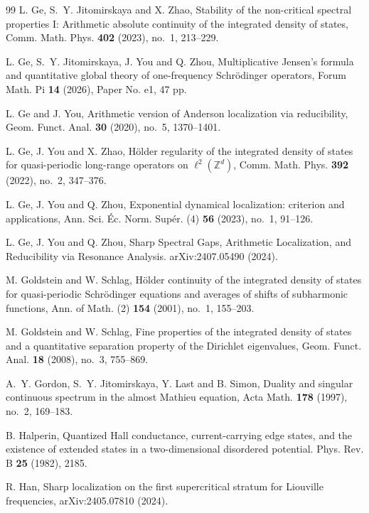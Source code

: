 \documentclass[reqno,11pt]{amsart}
\newcommand{\Z}{{\mathbb Z}}
\begin{document}
\begin{thebibliography}{99}
L. Ge, S.~Y. Jitomirskaya and X. Zhao, Stability of the non-critical spectral properties I: Arithmetic absolute continuity of the integrated density of states, Comm. Math. Phys. {\bf 402} (2023), no.~1, 213--229.

L. Ge, S.~Y. Jitomirskaya, J. You and Q. Zhou, Multiplicative Jensen's formula and quantitative global theory of one-frequency Schr\"odinger operators, Forum Math. Pi {\bf 14} (2026), Paper No. e1, 47 pp.



L. Ge and J. You, Arithmetic version of Anderson localization via reducibility, Geom. Funct. Anal. {\bf 30} (2020), no.~5, 1370--1401.

L. Ge, J. You and X. Zhao, H\"older regularity of the integrated density of states for quasi-periodic long-range operators on $\ell^2(\Z^d)$, Comm. Math. Phys. {\bf 392} (2022), no.~2, 347--376.

     L. Ge, J. You and Q. Zhou, Exponential dynamical localization: criterion and applications, Ann. Sci. \'Ec. Norm. Sup\'er. (4) {\bf 56} (2023), no.~1, 91--126.

     L. Ge, J. You and Q. Zhou, Sharp Spectral Gaps, Arithmetic Localization, and Reducibility via Resonance Analysis. arXiv:2407.05490 (2024).
	 



M. Goldstein and W. Schlag, H\"older continuity of the integrated density of states for quasi-periodic Schr\"odinger equations and averages of shifts of subharmonic functions, Ann. of Math. (2) {\bf 154} (2001), no.~1, 155--203.


M. Goldstein and W. Schlag, Fine properties of the integrated density of states and a quantitative separation property of the Dirichlet eigenvalues, Geom. Funct. Anal. {\bf 18} (2008), no.~3, 755--869.

A.~Y. Gordon, S.~Y. Jitomirskaya, Y. Last and B. Simon,  Duality and singular continuous spectrum in the almost Mathieu equation, Acta Math. {\bf 178} (1997), no.~2, 169--183.

  B. Halperin, Quantized Hall conductance, current-carrying edge states, and the existence of extended
states in a two-dimensional disordered potential.  Phys. Rev. B {\bf25} (1982), 2185.

 R. Han, Sharp localization on the first supercritical stratum for Liouville frequencies, arXiv:2405.07810 (2024).


\end{thebibliography}
\end{document}
